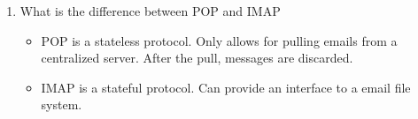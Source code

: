 \documentclass{article}
\begin{document}
\begin{enumerate}
\item What is the difference between POP and IMAP
\begin{itemize}
\item POP is a stateless protocol. Only allows for pulling emails from a centralized server. After the pull, messages are discarded.
\item IMAP is a stateful protocol. Can provide an interface to a email file system.
\end{itemize}
\end{enumerate}
\end{document}

